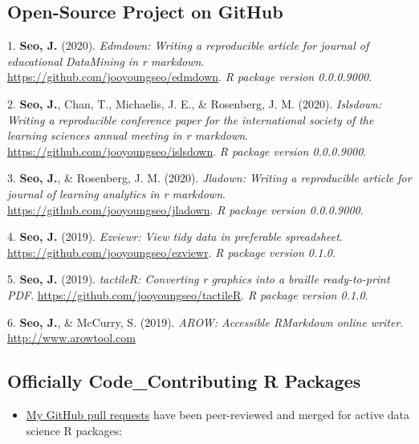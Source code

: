 \documentclass[11pt,a4paper,]{awesome-cv}
\providecommand{\tightlist}{%
	\setlength{\itemsep}{0pt}\setlength{\parskip}{0pt}}
\begin{document}
\newpage

\hypertarget{open-source-project-on-github}{%
\subsection{Open-Source Project on
GitHub}\label{open-source-project-on-github}}

\hypertarget{bibliography}{}
\leavevmode{}%
1. \textbf{Seo, J.} (2020). \emph{Edmdown: Writing a reproducible
article for journal of educational DataMining in r markdown}.
\url{https://github.com/jooyoungseo/edmdown}. \emph{R package version
0.0.0.9000}.

\leavevmode{}%
2. \textbf{Seo, J.}, Chan, T., Michaelis, J. E., \& Rosenberg, J. M.
(2020). \emph{Islsdown: Writing a reproducible conference paper for the
international society of the learning sciences annual meeting in r
markdown}. \url{https://github.com/jooyoungseo/islsdown}. \emph{R
package version 0.0.0.9000}.

\leavevmode{}%
3. \textbf{Seo, J.}, \& Rosenberg, J. M. (2020). \emph{Jladown: Writing
a reproducible article for journal of learning analytics in r markdown}.
\url{https://github.com/jooyoungseo/jladown}. \emph{R package version
0.0.0.9000}.

\leavevmode{}%
4. \textbf{Seo, J.} (2019). \emph{Ezviewr: View tidy data in preferable
spreadsheet}. \url{https://github.com/jooyoungseo/ezviewr}. \emph{R
package version 0.1.0}.

\leavevmode{}%
5. \textbf{Seo, J.} (2019). \emph{tactileR: Converting r graphics into a
braille ready-to-print PDF}.
\url{https://github.com/jooyoungseo/tactileR}. \emph{R package version
0.1.0}.

\leavevmode{}%
6. \textbf{Seo, J.}, \& McCurry, S. (2019). \emph{AROW: Accessible
RMarkdown online writer}. \url{http://www.arowtool.com}

\hypertarget{officially-code_contributing-r-packages}{%
\subsection{Officially Code\_Contributing R
Packages}\label{officially-code_contributing-r-packages}}

\begin{itemize}
\tightlist
\item
  \href{https://github.com/pulls?q=is\%3Apr+author\%3Ajooyoungseo+archived\%3Afalse+is\%3Aclosed}{My
  GitHub pull requests} have been peer-reviewed and merged for active
  data science R packages:
\end{itemize}
\end{document}
